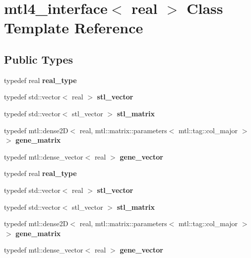 \hypertarget{classmtl4__interface}{}\section{mtl4\+\_\+interface$<$ real $>$ Class Template Reference}
\label{classmtl4__interface}
\subsection*{Public Types}
\begin{DoxyCompactItemize}
\item 
\mbox{\label{classmtl4__interface_a83d2c63d4cbc2f90f8f7c47a2b0015fc}} 
typedef real {\bfseries real\+\_\+type}
\item 
\mbox{\label{classmtl4__interface_abe1b58369df8fb6cb4d983b4faf02ad7}} 
typedef std\+::vector$<$ real $>$ {\bfseries stl\+\_\+vector}
\item 
\mbox{\label{classmtl4__interface_a3da80d6f61e08e6cc69149795141f705}} 
typedef std\+::vector$<$ stl\+\_\+vector $>$ {\bfseries stl\+\_\+matrix}
\item 
\mbox{\label{classmtl4__interface_a55523e845e9f9427d87d3a289279d57c}} 
typedef mtl\+::dense2D$<$ real, mtl\+::matrix\+::parameters$<$ mtl\+::tag\+::col\+\_\+major $>$ $>$ {\bfseries gene\+\_\+matrix}
\item 
\mbox{\label{classmtl4__interface_ab0c96d9984a36ac41a08c2695473e9f0}} 
typedef mtl\+::dense\+\_\+vector$<$ real $>$ {\bfseries gene\+\_\+vector}
\item 
\mbox{\label{classmtl4__interface_a83d2c63d4cbc2f90f8f7c47a2b0015fc}} 
typedef real {\bfseries real\+\_\+type}
\item 
\mbox{\label{classmtl4__interface_abe1b58369df8fb6cb4d983b4faf02ad7}} 
typedef std\+::vector$<$ real $>$ {\bfseries stl\+\_\+vector}
\item 
\mbox{\label{classmtl4__interface_a3da80d6f61e08e6cc69149795141f705}} 
typedef std\+::vector$<$ stl\+\_\+vector $>$ {\bfseries stl\+\_\+matrix}
\item 
\mbox{\label{classmtl4__interface_a55523e845e9f9427d87d3a289279d57c}} 
typedef mtl\+::dense2D$<$ real, mtl\+::matrix\+::parameters$<$ mtl\+::tag\+::col\+\_\+major $>$ $>$ {\bfseries gene\+\_\+matrix}
\item 
\mbox{\label{classmtl4__interface_ab0c96d9984a36ac41a08c2695473e9f0}} 
typedef mtl\+::dense\+\_\+vector$<$ real $>$ {\bfseries gene\+\_\+vector}
\end{DoxyCompactItemize}
